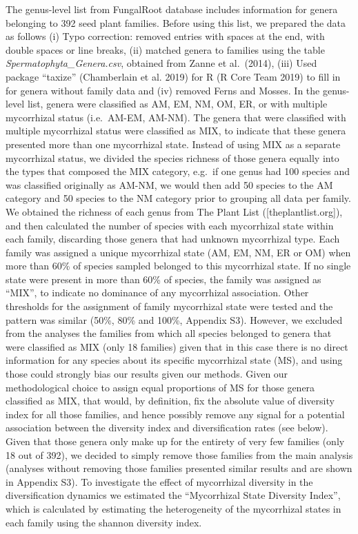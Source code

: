 \documentclass[
  12pt,
]{article}
\begin{document}
The genus-level list from FungalRoot database includes information for
genera belonging to 392 seed plant families. Before using this list, we
prepared the data as follows (i) Typo correction: removed entries with
spaces at the end, with double spaces or line breaks, (ii) matched
genera to families using the table \emph{Spermatophyta\_Genera.csv},
obtained from Zanne et al.~(2014), (iii) Used package ``taxize''
(Chamberlain et al. 2019) for R (R Core Team 2019) to fill in for genera
without family data and (iv) removed Ferns and Mosses. In the
genus-level list, genera were classified as AM, EM, NM, OM, ER, or with
multiple mycorrhizal status (i.e.~AM-EM, AM-NM). The genera that were
classified with multiple mycorrhizal status were classified as MIX, to
indicate that these genera presented more than one mycorrhizal state.
Instead of using MIX as a separate mycorrhizal status, we divided the
species richness of those genera equally into the types that composed
the MIX category, e.g.~if one genus had 100 species and was classified
originally as AM-NM, we would then add 50 species to the AM category and
50 species to the NM category prior to grouping all data per family. We
obtained the richness of each genus from The Plant List
({[}theplantlist.org{]}), and then calculated the number of species with
each mycorrhizal state within each family, discarding those genera that
had unknown mycorrhizal type. Each family was assigned a unique
mycorrhizal state (AM, EM, NM, ER or OM) when more than 60\% of species
sampled belonged to this mycorrhizal state. If no single state were
present in more than 60\% of species, the family was assigned as
``MIX'', to indicate no dominance of any mycorrhizal association. Other
thresholds for the assignment of family mycorrhizal state were tested
and the pattern was similar (50\%, 80\% and 100\%, Appendix S3).
However, we excluded from the analyses the families from which all
species belonged to genera that were classified as MIX (only 18
families) given that in this case there is no direct information for any
species about its specific mycorrhizal state (MS), and using those could
strongly bias our results given our methods. Given our methodological
choice to assign equal proportions of MS for those genera classified as
MIX, that would, by definition, fix the absolute value of diversity
index for all those families, and hence possibly remove any signal for a
potential association between the diversity index and diversification
rates (see below). Given that those genera only make up for the entirety
of very few families (only 18 out of 392), we decided to simply remove
those families from the main analysis (analyses without removing those
families presented similar results and are shown in Appendix S3). To
investigate the effect of mycorrhizal diversity in the diversification
dynamics we estimated the ``Mycorrhizal State Diversity Index'', which
is calculated by estimating the heterogeneity of the mycorrhizal states
in each family using the shannon diversity index.
\end{document}
